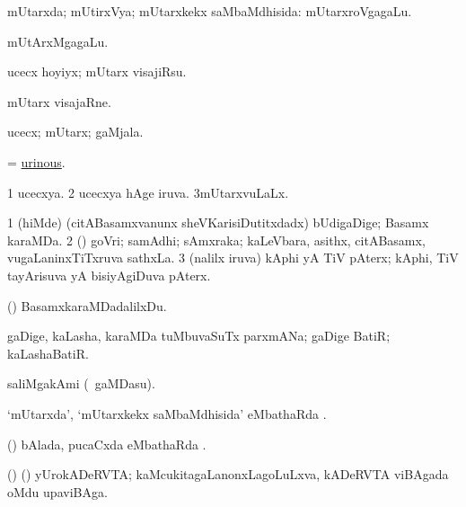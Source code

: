 \bentry
{} 
\gl{\gu}
\expl{}
\bmng
mUtarxda; mUtirxVya; mUtarxkekx saMbaMdhisida:  mUtarxroVgagaLu. 
\emng

\noindent 
\gl{\pagu}
\expl{}
\bmng
{} mUtArxMgagaLu. 
\emng
\eentry

\bentry
{} 
\gl{\akirx}
\expl{}
\bmng
ucecx hoyiyx; mUtarx visajiRsu. 
\emng
\eentry

\bentry
{} 
\gl{\nA}
\expl{}
\bmng
mUtarx visajaRne. 
\emng
\eentry

\bentry
{} 
\gl{\nA}
\expl{}
\bmng
ucecx; mUtarx; gaMjala. 
\emng
\eentry

\bentry
{} 
\gl{\gu}
\expl{}
\bmng
= \hyperlink{urinous}{urinous}. 
\emng
\eentry

\bentry
{} 
\gl{\gu}
\expl{}
\bmng
\bnum
\num{1} ucecxya. 
\num{2} ucecxya hAge iruva. 
\num{3}mUtarxvuLaLx. 
\enum
\emng
\eentry

{} 
\gl{\nA}
\expl{}
\bmng
\bnum
\num{1} (hiMde) (citABasamxvanunx sheVKarisiDutitxdadx) bUdigaDige; Basamx karaMDa.  
\num{2} (\kAparx) goVri; samAdhi; sAmxraka; kaLeVbara, asithx, citABasamx, \mo vugaLaninxTiTxruva sathxLa. 
\num{3} (nalilx iruva) kAphi yA TiV pAterx; kAphi, TiV tayArisuva yA bisiyAgiDuva pAterx. 
\enum
\emng
\eentry

\bentry
{} 
\gl{\sakirx}
\expl{}
\bmng
(\pArxparx) BasamxkaraMDadalilxDu. 
\emng
\eentry

\bentry
{} 
\gl{\nA}
\bmng
gaDige, kaLasha, karaMDa tuMbuvaSuTx parxmANa; gaDige BatiR; kaLashaBatiR. 
\emng
\eentry

\bentry
{} 
\gl{\nA}
\expl{}
\bmng
saliMgakAmi (\sA\ gaMDasu). 
\emng
\eentry

\bentry
{} 
\gl{\sapUpa}
\expl{}
\bmng
`mUtarxda', `mUtarxkekx saMbaMdhisida' eMbathaRda \sapUpa. 
\emng
\eentry

\bentry
{} 
\gl{\sapUpa}
\expl{}
\bmng
(\pArxvi) bAlada, pucaCxda eMbathaRda \sapUpa. 
\emng
\eentry

\bentry
{} 
\gl{\nA}
\expl{}
\bmng
(\bava) (\pArxvi) yUrokADeRVTA; kaMcukitagaLanonxLagoLuLxva, kADeRVTA viBAgada oMdu upaviBAga. 
\emng
\eentry

